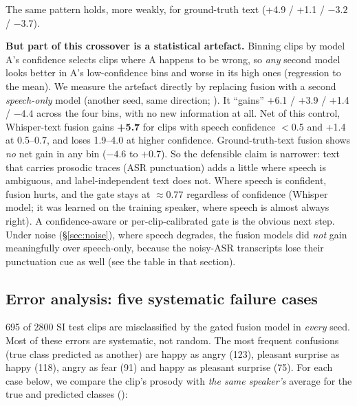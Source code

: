 The same pattern holds, more weakly, for ground-truth text (+4.9 / +1.1 / $-3.2$ / $-3.7$).

\textbf{But part of this crossover is a statistical artefact.} Binning clips by model A's confidence selects clips where A happens to be wrong, so \emph{any} second model looks better in A's low-confidence bins and worse in its high ones (regression to the mean).
We measure the artefact directly by replacing fusion with a second \emph{speech-only} model (another seed, same direction; ).
It ``gains'' +6.1 / +3.9 / +1.4 / $-4.4$\pp{} across the four bins, with no new information at all.
Net of this control, Whisper-text fusion gains \textbf{+5.7}\pp{} for clips with speech confidence $<$0.5 and +1.4\pp{} at 0.5--0.7, and loses 1.9--4.0\pp{} at higher confidence.
Ground-truth-text fusion shows \emph{no} net gain in any bin ($-4.6$ to $+0.7$\pp).
So the defensible claim is narrower: text that carries prosodic traces (ASR punctuation) adds a little where speech is ambiguous, and label-independent text does not.
Where speech is confident, fusion hurts, and the gate stays at $\approx0.77$ regardless of confidence (Whisper model; it was learned on the training speaker, where speech is almost always right).
A confidence-aware or per-clip-calibrated gate is the obvious next step.
Under noise (\S\ref{sec:noise}), where speech degrades, the fusion models did \emph{not} gain meaningfully over speech-only, because the noisy-ASR transcripts lose their punctuation cue as well (see the table in that section).

\subsection{Error analysis: five systematic failure cases}\label{sec:errors}
695 of 2800 SI test clips are misclassified by the gated fusion model in \emph{every} seed. Most of these errors are systematic, not random.
The most frequent confusions (true class predicted as another) are happy as angry (123), pleasant surprise as happy (118), angry as fear (91) and happy as pleasant surprise (75).
For each case below, we compare the clip's prosody with \emph{the same speaker's} average for the true and predicted classes ():

